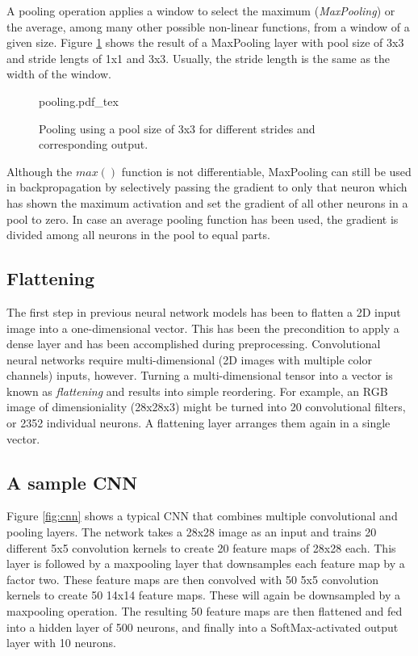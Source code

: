 A pooling operation applies a window to select the maximum (\emph{MaxPooling}) or the average, among many other possible non-linear functions, from a window of a given size. Figure \ref{fig:pooling} shows the result of a MaxPooling layer with pool size of 3x3 and stride lengts of 1x1 and 3x3. Usually, the stride length is the same as the width of the window.

\begin{figure}[htb]
    \centering
    \def\svgwidth{0.8\textwidth}
    {pooling.pdf_tex}
    \caption{Pooling using a pool size of 3x3 for different strides and corresponding output.\label{fig:pooling}}
\end{figure}

Although the $max()$ function is not differentiable, MaxPooling can still be used in backpropagation by selectively passing the gradient to only that neuron which has shown the maximum activation and set the gradient of all other neurons in a pool to zero. In case an average pooling function has been used, the gradient is divided among all neurons in the pool to equal parts. 

\subsection{Flattening}

The first step in previous neural network models has been to flatten a 2D input image into a one-dimensional vector. This has been the precondition to apply a dense layer and has been accomplished during preprocessing. Convolutional neural networks require multi-dimensional (2D images with multiple color channels) inputs, however. Turning a multi-dimensional tensor into a vector is known as \emph{flattening} and results into simple reordering. For example, an RGB image of dimensioniality (28x28x3) might be turned into 20 convolutional filters, or 2352 individual neurons. A flattening layer arranges them again in a single vector.

\subsection{A sample CNN}

Figure \ref{fig:cnn} shows a typical CNN that combines multiple convolutional and pooling layers. The network takes a 28x28 image as an input and trains 20 different 5x5 convolution kernels to create 20 feature maps of 28x28 each. This layer is followed by a maxpooling layer that downsamples each feature map by a factor two. These feature maps are then convolved with 50 5x5 convolution kernels to create 50 14x14 feature maps. These will again be downsampled by a maxpooling operation. The resulting 50 feature maps are then flattened and fed into a hidden layer of 500 neurons, and finally into a SoftMax-activated output layer with 10 neurons.


